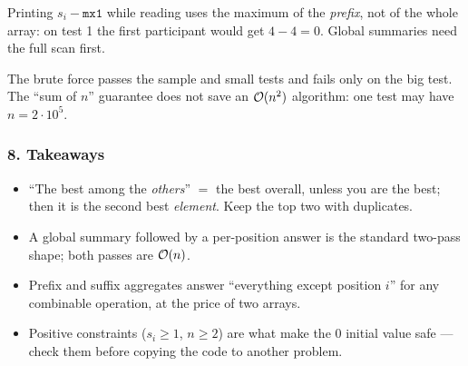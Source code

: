\begin{warningbox}
Printing $s_i - \texttt{mx1}$ while reading uses the maximum of the \emph{prefix}, not of the whole array: on test 1 the first participant would get $4 - 4 = 0$. Global summaries need the full scan first.
\end{warningbox}

\begin{warningbox}
The brute force passes the sample and small tests and fails only on the big test. The ``sum of $n$'' guarantee does not save an $\mathcal{O}(n^2)$ algorithm: one test may have $n = 2\cdot10^5$.
\end{warningbox}

\subsubsection*{8. Takeaways}

\begin{itemize}[leftmargin=*]
    \item ``The best among the \emph{others}'' $=$ the best overall, unless you are the best; then it is the second best \emph{element}. Keep the top two with duplicates.
    \item A global summary followed by a per-position answer is the standard two-pass shape; both passes are $\mathcal{O}(n)$.
    \item Prefix and suffix aggregates answer ``everything except position $i$'' for any combinable operation, at the price of two arrays.
    \item Positive constraints ($s_i \ge 1$, $n \ge 2$) are what make the $0$ initial value safe --- check them before copying the code to another problem.
\end{itemize}

